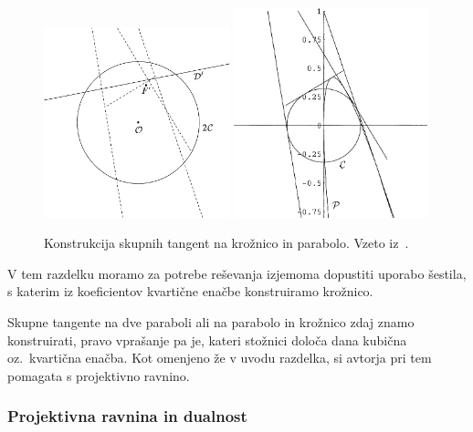 \begin{figure}[h]
    \centering
    \includegraphics[width=0.48\textwidth]{images/tang_krozn_par1.png}
    \includegraphics[width=0.5\textwidth]{images/tang_krozn_par2.png}
    \caption[Skupna tangenta na krožnico in parabolo]{Konstrukcija skupnih tangent na krožnico in parabolo. Vzeto iz~\cite[str.\ 24--25]{edwards2001}.}
    \label{fig:tang_kroznica_par}
\end{figure}

\begin{opomba}
    V tem razdelku moramo za potrebe reševanja izjemoma dopustiti uporabo šestila, s katerim iz koeficientov kvartične enačbe konstruiramo krožnico.
\end{opomba}

Skupne tangente na dve paraboli ali na parabolo in krožnico zdaj znamo konstruirati, pravo vprašanje pa je, kateri stožnici določa dana kubična oz.\ kvartična enačba. Kot omenjeno že v uvodu razdelka, si avtorja pri tem pomagata s projektivno ravnino. 

\subsubsection*{Projektivna ravnina in dualnost}

